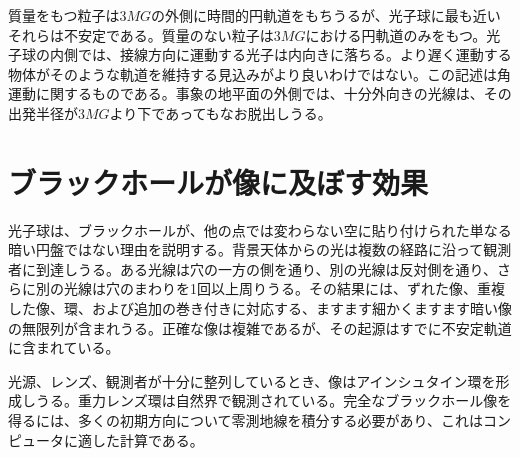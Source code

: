\begin{classroomqa}
\end{classroomqa}

質量をもつ粒子は\(3MG\)の外側に時間的円軌道をもちうるが、光子球に最も近いそれらは不安定である。質量のない粒子は\(3MG\)における円軌道のみをもつ。光子球の内側では、接線方向に運動する光子は内向きに落ちる。より遅く運動する物体がそのような軌道を維持する見込みがより良いわけではない。この記述は角運動に関するものである。事象の地平面の外側では、十分外向きの光線は、その出発半径が\(3MG\)より下であってもなお脱出しうる。

\section{ブラックホールが像に及ぼす効果}

光子球は、ブラックホールが、他の点では変わらない空に貼り付けられた単なる暗い円盤ではない理由を説明する。背景天体からの光は複数の経路に沿って観測者に到達しうる。ある光線は穴の一方の側を通り、別の光線は反対側を通り、さらに別の光線は穴のまわりを1回以上周りうる。その結果には、ずれた像、重複した像、環、および追加の巻き付きに対応する、ますます細かくますます暗い像の無限列が含まれうる。正確な像は複雑であるが、その起源はすでに不安定軌道に含まれている。

光源、レンズ、観測者が十分に整列しているとき、像はアインシュタイン環を形成しうる。重力レンズ環は自然界で観測されている。完全なブラックホール像を得るには、多くの初期方向について零測地線を積分する必要があり、これはコンピュータに適した計算である。

\begin{classroomqa}
\end{classroomqa}

\begin{classroomqa}
\end{classroomqa}


